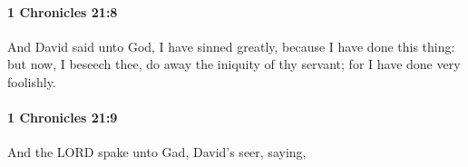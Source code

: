 		\paragraph{1 Chronicles 21:8} %
			\label{1CHRONICLES-21-8}

			And David said unto God, I have sinned greatly, because I have done this thing: but now, I beseech thee, do away the iniquity of thy servant; for I have done very foolishly.


		\paragraph{1 Chronicles 21:9} %
			\label{1CHRONICLES-21-9}

			And the LORD spake unto Gad, David’s seer, saying,


